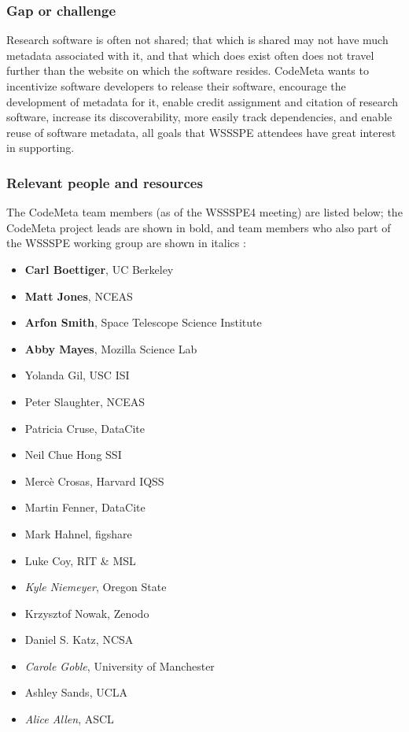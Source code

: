 \subsubsection{Gap or challenge}

Research software is often not shared; that which is shared may not have much metadata associated with it, and that which does exist often does not travel further than the website on which the software resides. CodeMeta wants to incentivize software developers to release their software, encourage the development of metadata for it, enable credit assignment and citation of research software, increase its discoverability, more easily track dependencies, and enable reuse of software metadata, all goals that WSSSPE attendees have great interest in supporting.

\subsubsection{Relevant people and resources}

The CodeMeta team members (as of the WSSSPE4 meeting) are listed below; the CodeMeta project leads are shown in bold, and team members who also part of the WSSSPE working group are shown in italics :

\begin{itemize}
\item {\bf Carl Boettiger}, UC Berkeley
\item {\bf Matt Jones}, NCEAS
\item {\bf Arfon Smith}, Space Telescope Science Institute
\item {\bf Abby Mayes}, Mozilla Science Lab
\item Yolanda Gil, USC ISI
\item Peter Slaughter, NCEAS
\item Patricia Cruse, DataCite
\item Neil Chue Hong SSI
\item Merc\`{e} Crosas, Harvard IQSS
\item Martin Fenner, DataCite
\item Mark Hahnel, figshare
\item Luke Coy, RIT \& MSL
\item {\em Kyle Niemeyer}, Oregon State
\item Krzysztof Nowak, Zenodo
\item Daniel S. Katz, NCSA
\item {\em Carole Goble}, University of Manchester
\item Ashley Sands, UCLA
\item {\em Alice Allen}, ASCL

\end {itemize}

